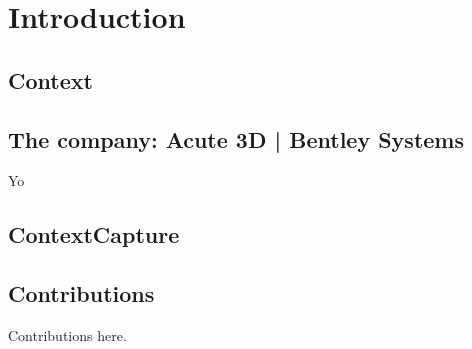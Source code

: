 \chapter{Introduction}

\section{Context}


\section{The company: Acute 3D | Bentley Systems}

Yo \cite{15}


\section{ContextCapture}


\section{Contributions}

Contributions here.
